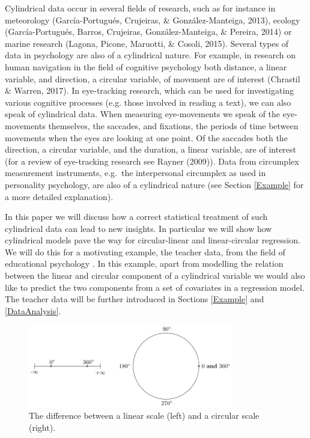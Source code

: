 \documentclass[11pt,]{article}
\begin{document}
Cylindrical data occur in several fields of research, such as for
instance in meteorology (García-Portugués, Crujeiras, \&
González-Manteiga, 2013), ecology (García-Portugués, Barros, Crujeiras,
González-Manteiga, \& Pereira, 2014) or marine research (Lagona, Picone,
Maruotti, \& Cosoli, 2015). Several types of data in psychology are also
of a cylindrical nature. For example, in research on human navigation in
the field of cognitive psychology both distance, a linear variable, and
direction, a circular variable, of movement are of interest (Chrastil \&
Warren, 2017). In eye-tracking research, which can be used for
investigating various cognitive processes (e.g. those involved in
reading a text), we can also speak of cylindrical data. When measuring
eye-movements we speak of the eye-movements themselves, the saccades,
and fixations, the periods of time between movements when the eyes are
looking at one point. Of the saccades both the direction, a circular
variable, and the duration, a linear variable, are of interest (for a
review of eye-tracking research see Rayner (2009)). Data from circumplex
measurement instruments, e.g.~the interpersonal circumplex as used in
personality psychology, are also of a cylindrical nature (see Section
\ref{Example} for a more detailed explanation).

In this paper we will discuss how a correct statistical treatment of
such cylindrical data can lead to new insights. In particular we will
show how cylindrical models pave the way for circular-linear and
linear-circular regression. We will do this for a motivating example,
the teacher data, from the field of educational psychology . In this
example, apart from modelling the relation between the linear and
circular component of a cylindrical variable we would also like to
predict the two components from a set of covariates in a regression
model. The teacher data will be further introduced in Sections
\ref{Example} and \ref{DataAnalysis}.

\begin{figure}
\centering
\includegraphics[width = 0.8\textwidth]{Plots/circline.pdf}
\caption{The difference between a linear scale (left) and a circular scale (right).}
\label{circline}
\end{figure}
\end{document}
